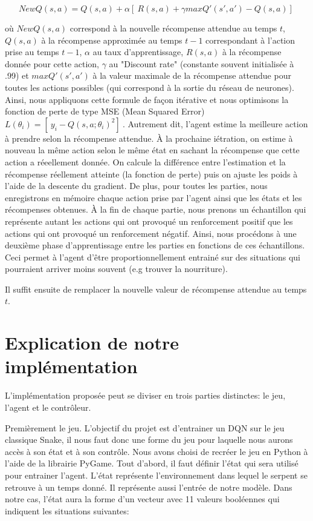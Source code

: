 \documentclass{article}
\begin{document}
$$NewQ(s,a) = Q(s,a)  + \alpha [\ R(s,a) + \gamma maxQ{'} (s{'},a{'}) - Q(s,a) ]\ $$

où $NewQ(s,a) $ correspond à la nouvelle récompense attendue au temps $t$, $Q(s,a)$ à la récompense approximée au temps $t-1$ correspondant à l'action prise au temps $t-1$, $\alpha$ au taux d'apprentissage, $R(s,a)$ à la récompense donnée pour cette action, $\gamma$ au "Discount rate" (constante souvent initialisée à .99) et $maxQ{'} (s{'},a{'})$ à la valeur maximale de la récompense attendue pour toutes les actions possibles (qui correspond à la sortie du réseau de neurones). Ainsi, nous appliquons cette formule de façon itérative et nous optimisons la fonction de perte de type MSE (Mean Squared Error)  $L( \theta_{i}) = [\ y_{i} - Q(s,a; \theta_{i})^{2} ]\ $. Autrement dit, l'agent estime la meilleure action à prendre selon la récompense attendue. À la prochaine iétration, on estime à nouveau la même action selon le même état en sachant la récompense que cette action a réeellement donnée. On calcule la différence entre l'estimation et la récompense réellement atteinte (la fonction de perte) puis on ajuste les poids à l'aide de la descente du gradient. De plus, pour toutes les parties, nous enregistrons en mémoire chaque action prise par l'agent ainsi que les états et les récompenses obtenues. À la fin de chaque partie, nous prenons un échantillon qui représente autant les actions qui ont provoqué un renforcement positif que les actions qui ont provoqué un renforcement négatif. Ainsi, nous procédons à une deuxième phase d'apprentissage entre les parties en fonctions de ces échantillons. Ceci permet à l'agent d'être proportionnellement entrainé sur des situations qui pourraient arriver moins souvent (e.g trouver la nourriture). 

Il suffit ensuite de remplacer la nouvelle valeur de récompense attendue au temps $t$.

\section{Explication de notre implémentation}

L’implémentation proposée peut se diviser en trois parties distinctes: le jeu, l’agent et le contrôleur.

Premièrement le jeu. L’objectif du projet est d’entrainer un DQN sur le jeu classique Snake, il nous faut donc une forme du jeu pour laquelle nous aurons accès à son état et à son contrôle. Nous avons choisi de recréer le jeu en Python à l’aide de la librairie PyGame. Tout d'abord, il faut définir l’état qui sera utilisé pour entrainer l’agent. L’état représente l’environnement dans lequel le serpent se retrouve à un temps donné. Il représente aussi l’entrée de notre modèle. Dans notre cas, l’état aura la forme d’un vecteur avec 11 valeurs booléennes qui indiquent les situations suivantes:
\end{document}
